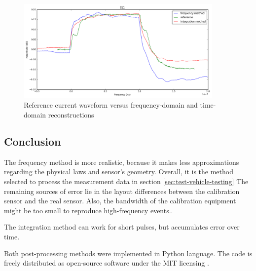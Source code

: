 \begin{figure}[!h]
  \centering
  \includegraphics[width=0.9\textwidth]{src/3/figures/final_comparison_reconstructions.png}
  \caption{Reference current waveform versus frequency-domain and time-domain reconstructions}
  \label{fig:freq-domain-reconstructed}
\end{figure}

\subsection{Conclusion}

The frequency method is more realistic, because it makes less approximations regarding the physical laws and sensor's geometry.
Overall, it is the method selected to process the measurement data in section \ref{sec:test-vehicle-testing}
The remaining sources of error lie in the layout differences between the calibration sensor and the real sensor.
Also, the bandwidth of the calibration equipment might be too small to reproduce high-frequency events..

The integration method can work for short pulses, but accumulates error over time.

Both post-processing methods were implemented in Python language.
The code is freely distributed \cite{nfs-repository} as open-source software under the MIT licensing \cite{mit-licensing}.
